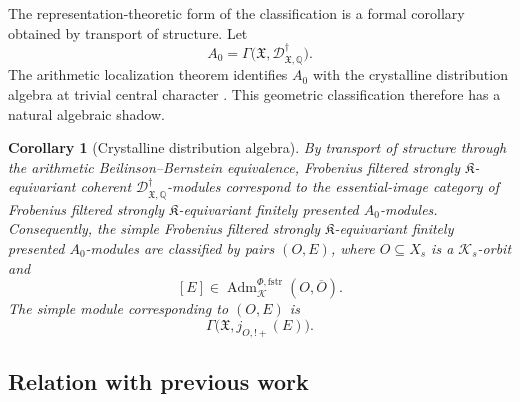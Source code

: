 \documentclass[11pt]{amsart}
\theoremstyle{plain}
\newtheorem{corollary}{Corollary}[section]
\theoremstyle{definition}
\theoremstyle{remark}
\newcommand{\fstr}{\mathrm{fstr}}
\newcommand{\Adm}{\operatorname{Adm}}
\begin{document}
The representation-theoretic form of the classification is a formal corollary obtained by transport of structure.
Let
\[
  A_0=\Gamma\bigl(\mathfrak X,
  \mathscr D^\dagger_{\mathfrak X,\mathbb Q}\bigr).
\]
The arithmetic localization theorem identifies \(A_0\) with the crystalline
distribution algebra at trivial central character \cite[Theorem 4.2.1]{HuygheSchmidtIntermediate}.
This geometric classification therefore has a natural algebraic shadow.

\begin{corollary}[Crystalline distribution algebra]
\label{thm:C-intro}
By transport of structure through the arithmetic Beilinson--Bernstein
equivalence, Frobenius filtered strongly \(\mathfrak K\)-equivariant coherent
\(\mathscr D^\dagger_{\mathfrak X,\mathbb Q}\)-modules correspond to the
essential-image category of Frobenius filtered strongly \(\mathfrak K\)-equivariant
finitely presented \(A_0\)-modules. Consequently, the simple Frobenius filtered strongly \(\mathfrak K\)-equivariant
finitely presented \(A_0\)-modules are classified by pairs \((O,E)\), where
\(O\subseteq X_s\) is a \(\mathcal K_s\)-orbit and
\[
  [E]\in \Adm^{\Phi,\fstr}_{\mathcal K}(O,\overline O).
\]
The simple module corresponding to \((O,E)\) is
\[
  \Gamma\bigl(\mathfrak X,j_{O,!+}(E)\bigr).
\]
\end{corollary}

\subsection*{Relation with previous work}
\end{document}
